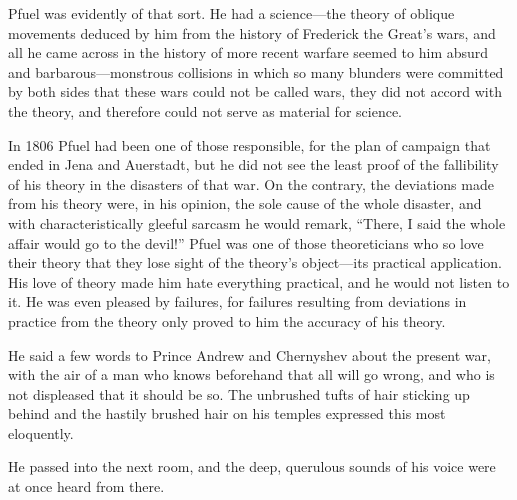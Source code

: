 Pfuel was evidently of that sort. He had a science---the theory
of oblique movements deduced by him from the history of Frederick
the Great's wars, and all he came across in the history of more
recent warfare seemed to him absurd and barbarous---monstrous
collisions in which so many blunders were committed by both sides
that these wars could not be called wars, they did not accord
with the theory, and therefore could not serve as material for
science.

In 1806 Pfuel had been one of those responsible, for the plan of
campaign that ended in Jena and Auerstadt, but he did not see the
least proof of the fallibility of his theory in the disasters of
that war. On the contrary, the deviations made from his theory
were, in his opinion, the sole cause of the whole disaster, and
with characteristically gleeful sarcasm he would remark, ``There,
I said the whole affair would go to the devil!'' Pfuel was one of
those theoreticians who so love their theory that they lose sight
of the theory's object---its practical application. His love of
theory made him hate everything practical, and he would not
listen to it. He was even pleased by failures, for failures
resulting from deviations in practice from the theory only proved
to him the accuracy of his theory.

He said a few words to Prince Andrew and Chernyshev about the
present war, with the air of a man who knows beforehand that all
will go wrong, and who is not displeased that it should be
so. The unbrushed tufts of hair sticking up behind and the
hastily brushed hair on his temples expressed this most
eloquently.

He passed into the next room, and the deep, querulous sounds of
his voice were at once heard from there.



